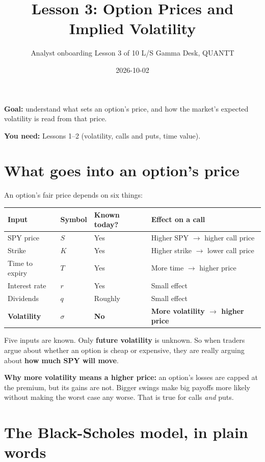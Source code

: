 \documentclass{article}
\title{Lesson 3: Option Prices and Implied Volatility}
\author{Analyst onboarding \textperiodcentered{} Lesson 3 of 10 \textperiodcentered{} L/S Gamma Desk, QUANTT}
\date{2026-10-02}
\begin{document}
\maketitle

\textbf{Goal:} understand what sets an option's price, and how the market's expected volatility is read from that price.

\textbf{You need:} Lessons 1--2 (volatility, calls and puts, time value).

\section{What goes into an option's price}

An option's fair price depends on six things:

\begin{center}\small
\begin{tabularx}{\linewidth}{>{\raggedright\arraybackslash}X l l >{\raggedright\arraybackslash}X}
\toprule
\textbf{Input} & \textbf{Symbol} & \textbf{Known today?} & \textbf{Effect on a call} \\
\midrule
SPY price & $S$ & Yes & Higher SPY \ensuremath{\rightarrow} higher call price \\
Strike & $K$ & Yes & Higher strike \ensuremath{\rightarrow} lower call price \\
Time to expiry & $T$ & Yes & More time \ensuremath{\rightarrow} higher price \\
Interest rate & $r$ & Yes & Small effect \\
Dividends & $q$ & Roughly & Small effect \\
\textbf{Volatility} & $\sigma$ & \textbf{No} & \textbf{More volatility \ensuremath{\rightarrow} higher price} \\
\bottomrule
\end{tabularx}
\end{center}

Five inputs are known. Only \textbf{future volatility} is unknown. So when traders argue about whether an option is cheap or expensive, they are really arguing about \textbf{how much SPY will move}.

\textbf{Why more volatility means a higher price:} an option's losses are capped at the premium, but its gains are not. Bigger swings make big payoffs more likely without making the worst case any worse. That is true for calls \emph{and} puts.

\section{The Black-Scholes model, in plain words}
\end{document}
